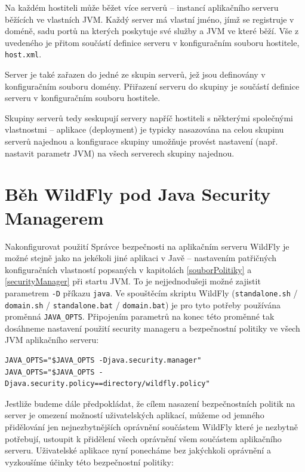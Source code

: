 Na každém hostiteli může běžet více serverů -- instancí aplikačního serveru běžících ve vlastních JVM. Každý server má vlastní jméno, jímž se registruje v doméně, sadu portů na kterých poskytuje své služby a JVM ve které běží. Vše z uvedeného je přitom součástí definice serveru v konfiguračním souboru hostitele, {\tt host.xml}. \cite{jbossDomainSetup}

Server je také zařazen do jedné ze skupin serverů, jež jsou definovány v konfiguračním souboru domény. Přiřazení serveru do skupiny je součástí definice serveru v konfiguračním souboru hostitele. \cite{jbossDomainSetup}

Skupiny serverů tedy seskupují servery napříč hostiteli s některými společnými vlastnostmi -- aplikace (deployment) je typicky nasazována na celou skupinu serverů najednou a konfigurace skupiny umožňuje provést nastavení (např. nastavit parametr JVM) na všech serverech skupiny najednou. \cite{jbossDomainSetup}

\section{Běh WildFly pod Java Security Managerem}

Nakonfigurovat použití Správce bezpečnosti na aplikačním serveru WildFly je možné stejně jako na jekékoli jiné aplikaci v Javě -- nastavením patřičných konfiguračních vlastností popsaných v kapitolách \ref{souborPolitiky} a \ref{securityManager} při startu JVM. To je nejjednodušeji možné zajistit parametrem {\tt -D} příkazu {\tt java}. Ve spouštěcím skriptu WildFly ({\tt standalone.sh} / {\tt domain.sh} / {\tt standalone.bat} / {\tt domain.bat}) je pro tyto potřeby používána proměnná {\tt JAVA\_OPTS}. Připojením parametrů na konec této proměnné tak dosáhneme nastavení použití security manageru a bezpečnostní politiky ve všech JVM aplikačního serveru: \cite{jbossSecurityManager}

\begin{verbatim}
JAVA_OPTS="$JAVA_OPTS -Djava.security.manager"
JAVA_OPTS="$JAVA_OPTS -Djava.security.policy==directory/wildfly.policy"
\end{verbatim}

Jestliže budeme dále předpokládat, že cílem nasazení bezpečnostních politik na server je omezení možností uživatelských aplikací, můžeme od jemného přidělování jen nejnezbytnějších oprávnění součástem WildFly které je nezbytně potřebují, ustoupit k přidělení všech oprávnění všem součástem aplikačního serveru. Uživatelské aplikace nyní ponecháme bez jakýchkoli oprávnění a vyzkoušíme účinky této bezpečnostní politiky:


